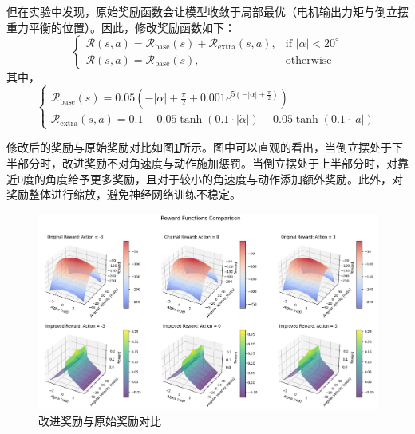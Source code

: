 \documentclass[12pt,a4paper]{article}
\begin{document}
但在实验中发现，原始奖励函数会让模型收敛于局部最优（电机输出力矩与倒立摆重力平衡的位置）。因此，修改奖励函数如下：
\begin{equation}
\begin{cases}
    \mathcal{R}(s, a) = \mathcal{R}_{\text{base}}(s) + \mathcal{R}_{\text{extra}}(s, a),
    & \text{if } |\alpha| < 20^{\circ}
    \\
    \mathcal{R}(s, a) = \mathcal{R}_{\text{base}}(s),
    & \text{otherwise}
\end{cases}
\end{equation}
其中，
\begin{equation}
\begin{cases}
    \mathcal{R}_{\text{base}}( s ) = 0.05 \left(-|\alpha| + \frac{\pi}{2} + 0.001 e^{5(-|\alpha| + \frac{\pi}{2})}\right)
    \\
    \mathcal{R}_{\text{extra}}( s, a ) = 0.1 - 0.05 \tanh ( 0.1 \cdot |\dot{\alpha}| ) - 0.05 \tanh ( 0.1 \cdot |a| )
\end{cases}
\end{equation}

修改后的奖励与原始奖励对比如图\ref{fig:compare}所示。图中可以直观的看出，当倒立摆处于下半部分时，改进奖励不对角速度与动作施加惩罚。当倒立摆处于上半部分时，对靠近0度的角度给予更多奖励，且对于较小的角速度与动作添加额外奖励。此外，对奖励整体进行缩放，避免神经网络训练不稳定。
\begin{figure}[htbp!]
    \centering
    \includegraphics[width=1\textwidth]{images/pendulum_reward_compare.png}
    \caption{改进奖励与原始奖励对比}
    \label{fig:compare}
\end{figure}
\end{document}

